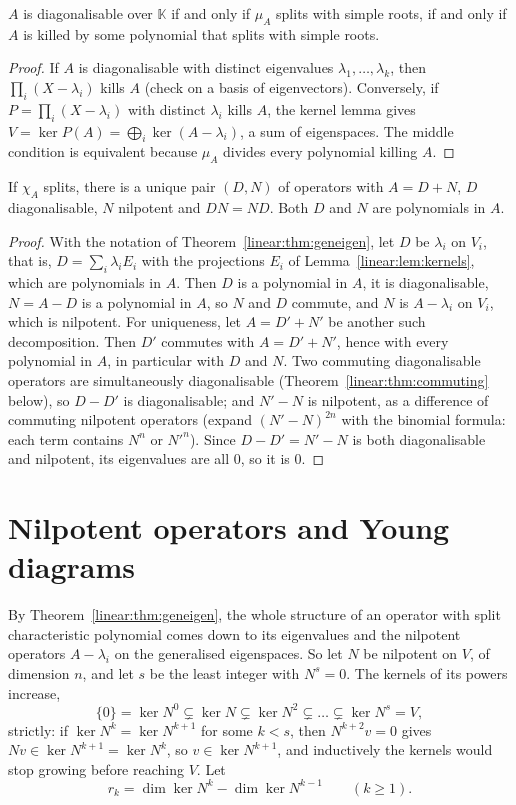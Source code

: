 \begin{corollary}[diagonalisability]\label{linear:cor:diag}
$A$ is diagonalisable over $\mathbb K$ if and only if $\mu_A$ splits with simple roots, if and only if $A$ is killed by some
polynomial that splits with simple roots.
\end{corollary}
\begin{proof}
If $A$ is diagonalisable with distinct eigenvalues $\lambda_1,\dots,\lambda_k$, then $\prod_i(X-\lambda_i)$ kills $A$ (check on
a basis of eigenvectors). Conversely, if $P=\prod_i(X-\lambda_i)$ with distinct $\lambda_i$ kills $A$, the kernel lemma gives
$V=\ker P(A)=\bigoplus_i\ker(A-\lambda_i)$, a sum of eigenspaces. The middle condition is equivalent because $\mu_A$ divides
every polynomial killing $A$.
\end{proof}

\begin{theorem}\label{linear:thm:dunford}
If $\chi_A$ splits, there is a unique pair $(D,N)$ of operators with $A=D+N$, $D$ diagonalisable, $N$ nilpotent and $DN=ND$.
Both $D$ and $N$ are polynomials in $A$.
\end{theorem}
\begin{proof}
With the notation of Theorem~\ref{linear:thm:geneigen}, let $D$ be $\lambda_i$ on $V_i$, that is, $D=\sum_i\lambda_iE_i$ with the
projections $E_i$ of Lemma~\ref{linear:lem:kernels}, which are polynomials in $A$. Then $D$ is a polynomial in $A$, it is
diagonalisable, $N=A-D$ is a polynomial in $A$, so $N$ and $D$ commute, and $N$ is $A-\lambda_i$ on $V_i$, which is
nilpotent. For uniqueness, let $A=D'+N'$ be another such decomposition. Then $D'$ commutes with $A=D'+N'$, hence with
every polynomial in $A$, in particular with $D$ and $N$. Two commuting diagonalisable operators are simultaneously
diagonalisable (Theorem~\ref{linear:thm:commuting} below), so $D-D'$ is diagonalisable; and $N'-N$ is nilpotent, as a difference
of commuting nilpotent operators (expand $(N'-N)^{2n}$ with the binomial formula: each term contains $N^n$ or $N'^n$).
Since $D-D'=N'-N$ is both diagonalisable and nilpotent, its eigenvalues are all $0$, so it is $0$.
\end{proof}

\section{Nilpotent operators and Young diagrams}\label{linear:sec:nilpotent}

By Theorem~\ref{linear:thm:geneigen}, the whole structure of an operator with split characteristic polynomial comes down to its
eigenvalues and the nilpotent operators $A-\lambda_i$ on the generalised eigenspaces. So let $N$ be nilpotent on $V$, of
dimension $n$, and let $s$ be the least integer with $N^s=0$. The kernels of its powers increase,
\[
\{0\}=\ker N^0\subsetneq\ker N\subsetneq\ker N^2\subsetneq\dots\subsetneq\ker N^s=V,
\]
strictly: if $\ker N^k=\ker N^{k+1}$ for some $k<s$, then $N^{k+2}v=0$ gives $Nv\in\ker N^{k+1}=\ker N^k$, so $v\in\ker
N^{k+1}$, and inductively the kernels would stop growing before reaching $V$. Let
\[
r_k=\dim\ker N^k-\dim\ker N^{k-1}\qquad(k\ge1).
\]

